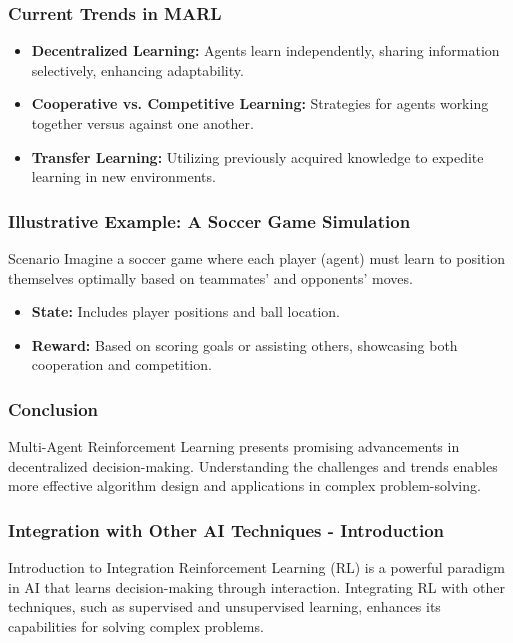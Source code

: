 \documentclass{beamer}
\begin{document}
\begin{frame}[fragile]
    \frametitle{Current Trends in MARL}
    \begin{itemize}
        \item \textbf{Decentralized Learning:} Agents learn independently, sharing information selectively, enhancing adaptability.
        \item \textbf{Cooperative vs. Competitive Learning:} Strategies for agents working together versus against one another.
        \item \textbf{Transfer Learning:} Utilizing previously acquired knowledge to expedite learning in new environments.
    \end{itemize}
\end{frame}

\begin{frame}[fragile]
    \frametitle{Illustrative Example: A Soccer Game Simulation}
    \begin{block}{Scenario}
        Imagine a soccer game where each player (agent) must learn to position themselves optimally based on teammates' and opponents' moves.
    \end{block}
    \begin{itemize}
        \item \textbf{State:} Includes player positions and ball location.
        \item \textbf{Reward:} Based on scoring goals or assisting others, showcasing both cooperation and competition.
    \end{itemize}
\end{frame}

\begin{frame}[fragile]
    \frametitle{Conclusion}
    Multi-Agent Reinforcement Learning presents promising advancements in decentralized decision-making. Understanding the challenges and trends enables more effective algorithm design and applications in complex problem-solving.
\end{frame}

\begin{frame}[fragile]
    \frametitle{Integration with Other AI Techniques - Introduction}
    \begin{block}{Introduction to Integration}
        Reinforcement Learning (RL) is a powerful paradigm in AI that learns decision-making through interaction. Integrating RL with other techniques, such as supervised and unsupervised learning, enhances its capabilities for solving complex problems.
    \end{block}
\end{frame}
\end{document}
